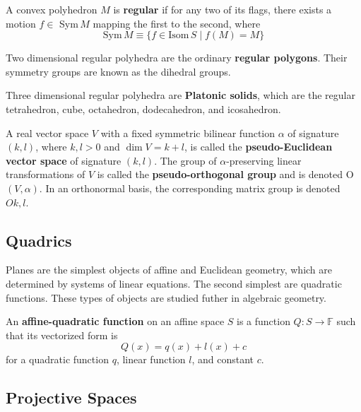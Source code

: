   \begin{definition}
    A convex polyhedron $M$ is \textbf{regular} if for any two of its flags, there exists a motion $f \in$ Sym$\,M$ mapping the first to the second, where 
    \begin{equation}
      \text{Sym}\,M \equiv \{f \in \text{Isom}\,S \;|\; f(M) = M \}
    \end{equation}
  \end{definition}

  Two dimensional regular polyhedra are the ordinary \textbf{regular polygons}. Their symmetry groups are known as the dihedral groups.

  Three dimensional regular polyhedra are \textbf{Platonic solids}, which are the regular tetrahedron, cube, octahedron, dodecahedron, and icosahedron. 

  \begin{definition}
    A real vector space $V$ with a fixed symmetric bilinear function $\alpha$ of signature $(k, l)$, where $k, l > 0$ and $\dim{V} = k+l$, is called the \textbf{pseudo-Euclidean vector space} of signature $(k, l)$. The group of $\alpha$-preserving linear transformations of $V$ is called the \textbf{pseudo-orthogonal group} and is denoted O$(V, \alpha)$. In an orthonormal basis, the corresponding matrix group is denoted $O{k,l}$. 
  \end{definition}

\subsection{Quadrics}

  Planes are the simplest objects of affine and Euclidean geometry, which are determined by systems of linear equations. The second simplest are quadratic functions. These types of objects are studied futher in algebraic geometry. 

  \begin{definition}
    An \textbf{affine-quadratic function} on an affine space $S$ is a function $Q: S \longrightarrow \mathbb{F}$ such that its vectorized form is
    \begin{equation}
      Q(x) = q(x) + l(x) + c
    \end{equation}
    for a quadratic function $q$, linear function $l$, and constant $c$. 
  \end{definition}

\subsection{Projective Spaces}

